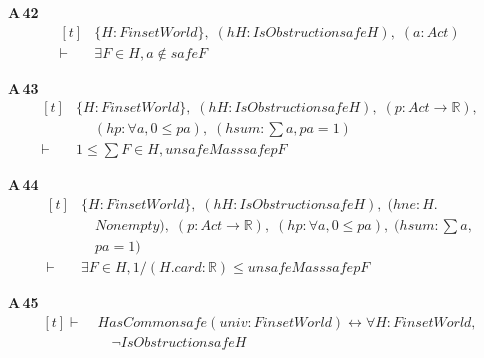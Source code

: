 \noindent\textbf{A\,42}\quad{}
{\footnotesize\[ \begin{aligned}[t]
&\{ \mathit{H} : \mathit{Finset} \mathit{World}\},\; (\mathit{hH} : \mathit{IsObstruction} \mathit{safe} \mathit{H}),\; (\mathit{a} : \mathit{Act})\\
\vdash\;&\exists \mathit{F} \in \mathit{H}, \mathit{a} \notin \mathit{safe} \mathit{F}
\end{aligned} \]}

\noindent\textbf{A\,43}\quad{}
{\footnotesize\[ \begin{aligned}[t]
&\{ \mathit{H} : \mathit{Finset} \mathit{World}\},\; (\mathit{hH} : \mathit{IsObstruction} \mathit{safe} \mathit{H}),\; (\mathit{p} : \mathit{Act} \to \mathbb{R} ),\\
&\quad \; (\mathit{hp} : \forall \mathit{a}, 0 \leq \mathit{p} \mathit{a}),\; (\mathit{hsum} : \textstyle\sum \mathit{a}, \mathit{p} \mathit{a} = 1)\\
\vdash\;&1 \leq \textstyle\sum \mathit{F} \in \mathit{H}, \mathit{unsafeMass} \mathit{safe} \mathit{p} \mathit{F}
\end{aligned} \]}

\noindent\textbf{A\,44}\quad{}
{\footnotesize\[ \begin{aligned}[t]
&\{ \mathit{H} : \mathit{Finset} \mathit{World}\},\; (\mathit{hH} : \mathit{IsObstruction} \mathit{safe} \mathit{H}),\; (\mathit{hne} : \mathit{H}.\\
&\quad \mathit{Nonempty}),\; (\mathit{p} : \mathit{Act} \to \mathbb{R} ),\; (\mathit{hp} : \forall \mathit{a}, 0 \leq \mathit{p} \mathit{a}),\; (\mathit{hsum} : \textstyle\sum \mathit{a},\\
&\quad \mathit{p} \mathit{a} = 1)\\
\vdash\;&\exists \mathit{F} \in \mathit{H}, 1 / (\mathit{H}.\mathit{card} : \mathbb{R} ) \leq \mathit{unsafeMass} \mathit{safe} \mathit{p} \mathit{F}
\end{aligned} \]}

\noindent\textbf{A\,45}\quad{}
{\footnotesize\[ \begin{aligned}[t]
\vdash\;&\mathit{HasCommon} \mathit{safe} (\mathit{univ} : \mathit{Finset} \mathit{World}) \leftrightarrow \forall \mathit{H} : \mathit{Finset} \mathit{World},\\
&\quad \neg \mathit{IsObstruction} \mathit{safe} \mathit{H}
\end{aligned} \]}

